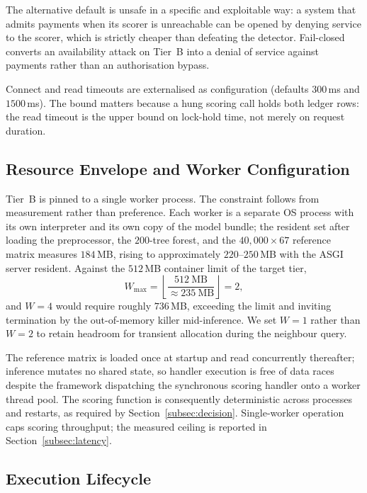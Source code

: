 \documentclass[conference]{IEEEtran}
\begin{document}
The alternative default is unsafe in a specific and exploitable way: a
system that admits payments when its scorer is unreachable can be
opened by denying service to the scorer, which is strictly cheaper than
defeating the detector. Fail-closed converts an availability attack on
Tier~B into a denial of service against payments rather than an
authorisation bypass.

Connect and read timeouts are externalised as configuration (defaults
$300$\,ms and $1500$\,ms). The bound matters because a hung scoring
call holds both ledger rows: the read timeout is the upper bound on
lock-hold time, not merely on request duration.

\subsection{Resource Envelope and Worker Configuration}
\label{subsec:resources}

Tier~B is pinned to a single worker process. The constraint follows
from measurement rather than preference. Each worker is a separate OS
process with its own interpreter and its own copy of the model bundle;
the resident set after loading the preprocessor, the $200$-tree forest,
and the $40{,}000\times 67$ reference matrix measures $184$\,MB, rising
to approximately $220$--$250$\,MB with the ASGI server resident.
Against the $512$\,MB container limit of the target tier,
\begin{equation}
W_{\max} = \left\lfloor \frac{512~\mathrm{MB}}{\approx 235~\mathrm{MB}} \right\rfloor = 2 ,
\label{eq:workers}
\end{equation}
and $W=4$ would require roughly $736$\,MB, exceeding the limit and
inviting termination by the out-of-memory killer mid-inference. We set
$W=1$ rather than $W=2$ to retain headroom for transient allocation
during the neighbour query.

The reference matrix is loaded once at startup and read concurrently
thereafter; inference mutates no shared state, so handler execution is
free of data races despite the framework dispatching the synchronous
scoring handler onto a worker thread pool. The scoring function is
consequently deterministic across processes and restarts, as required
by Section~\ref{subsec:decision}. Single-worker operation caps scoring
throughput; the measured ceiling is reported in
Section~\ref{subsec:latency}.

\subsection{Execution Lifecycle}
\label{subsec:lifecycle}
\end{document}
